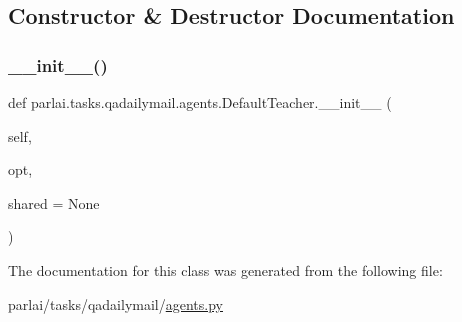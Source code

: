 \subsection{Constructor \& Destructor Documentation}
\mbox{\label{classparlai_1_1tasks_1_1qadailymail_1_1agents_1_1DefaultTeacher_a9b9a49fa6e1a61092205f2500fe4f933}} 
\subsubsection{\texorpdfstring{\+\_\+\+\_\+init\+\_\+\+\_\+()}{\_\_init\_\_()}}
{\footnotesize\ttfamily def parlai.\+tasks.\+qadailymail.\+agents.\+Default\+Teacher.\+\_\+\+\_\+init\+\_\+\+\_\+ (\begin{DoxyParamCaption}\item[{}]{self,  }\item[{}]{opt,  }\item[{}]{shared = {\ttfamily None} }\end{DoxyParamCaption})}



The documentation for this class was generated from the following file\+:\begin{DoxyCompactItemize}
\item 
parlai/tasks/qadailymail/\hyperlink{parlai_2tasks_2qadailymail_2agents_8py}{agents.\+py}\end{DoxyCompactItemize}
